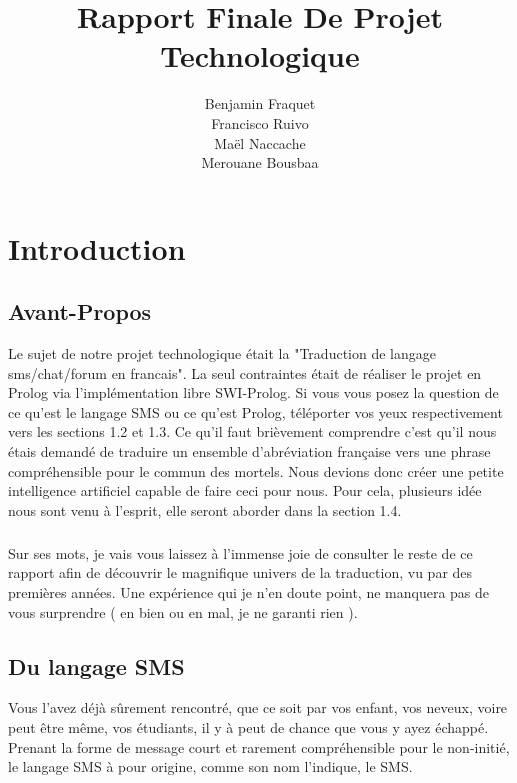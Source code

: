 \documentclass[11pt]{book}
\title{\textbf{Rapport Finale De Projet Technologique}}
\author{Benjamin Fraquet\\
		Francisco Ruivo\\
		Maël Naccache\\
		Merouane Bousbaa}
\date{}
\begin{document}
\maketitle

\tableofcontents

\newpage

\chapter{Introduction}
	\section{Avant-Propos}
	Le sujet de notre projet technologique était la "Traduction de langage sms/chat/forum en francais". La seul contraintes était de réaliser le projet en Prolog via l'implémentation libre SWI-Prolog. Si vous vous posez la question de ce qu'est le langage SMS ou ce qu'est Prolog, téléporter vos yeux respectivement vers les sections 1.2 et 1.3. Ce qu'il faut brièvement comprendre c'est qu'il nous étais demandé de traduire un ensemble d'abréviation française vers une phrase compréhensible pour le commun des mortels. Nous devions donc créer une petite intelligence artificiel capable de faire ceci pour nous. Pour cela, plusieurs idée nous sont venu à l'esprit, elle seront aborder dans la section 1.4.
	\paragraph{} Sur ses mots, je vais vous laissez à l'immense joie de consulter le reste de ce rapport afin de découvrir le magnifique univers de la traduction, vu par des premières années. Une expérience qui je n'en doute point, ne manquera pas de vous surprendre ( en bien ou en mal, je ne garanti rien ).
	
	\section{Du langage SMS}
	Vous l'avez déjà sûrement rencontré, que ce soit par vos enfant, vos neveux, voire peut être même, vos étudiants, il y à peut de chance que vous y ayez échappé. Prenant la forme de message court et rarement compréhensible pour le non-initié, le langage SMS à pour origine, comme son nom l'indique, le SMS.
\end{document}
